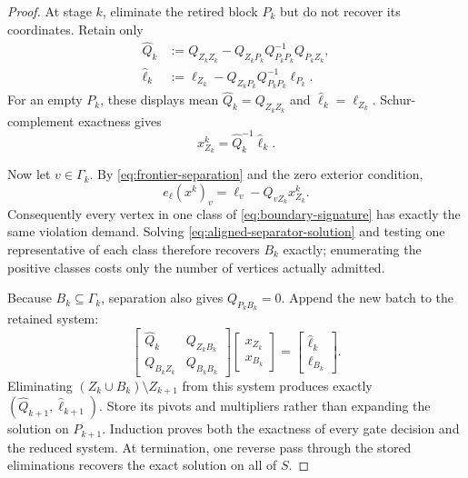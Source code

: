 \begin{proof}
At stage $k$, eliminate the retired block $P_k$ but do not recover its
coordinates.  Retain only
\begin{align}
 \widehat Q_k
 &:={Q}_{Z_kZ_k}
   -Q_{Z_kP_k}Q_{P_kP_k}^{-1}Q_{P_kZ_k},
 \label{eq:aligned-reduced-matrix}\\
 \widehat\ell_k
 &:=\ell_{Z_k}
   -Q_{Z_kP_k}Q_{P_kP_k}^{-1}\ell_{P_k}.
 \label{eq:aligned-reduced-load}
\end{align}
For an empty $P_k$, these displays mean
$\widehat Q_k=Q_{Z_kZ_k}$ and
$\widehat\ell_k=\ell_{Z_k}$.  Schur-complement exactness gives
\begin{equation}
 x^k_{Z_k}=\widehat Q_k^{-1}\widehat\ell_k.
 \label{eq:aligned-separator-solution}
\end{equation}

Now let $v\in\Gamma_k$.  By
\cref{eq:frontier-separation} and the zero exterior condition,
\begin{equation}
 e_\ell(x^k)_v
 =\ell_v-Q_{vZ_k}x^k_{Z_k}.
 \label{eq:signature-demand}
\end{equation}
Consequently every vertex in one class of
\cref{eq:boundary-signature} has exactly the same violation demand.  Solving
\cref{eq:aligned-separator-solution} and testing one representative of each
class therefore recovers $B_k$ exactly; enumerating the positive classes
costs only the number of vertices actually admitted.

Because $B_k\subseteq\Gamma_k$, separation also gives
$Q_{P_kB_k}=0$.  Append the new batch to the retained system:
\begin{equation}
 \begin{bmatrix}
  \widehat Q_k&Q_{Z_kB_k}\\
  Q_{B_kZ_k}&Q_{B_kB_k}
 \end{bmatrix}
 \begin{bmatrix}x_{Z_k}\\x_{B_k}\end{bmatrix}
 =
 \begin{bmatrix}\widehat\ell_k\\\ell_{B_k}\end{bmatrix}.
 \label{eq:aligned-frontal-system}
\end{equation}
Eliminating
$(Z_k\cup B_k)\setminus Z_{k+1}$ from this system produces exactly
$(\widehat Q_{k+1},\widehat\ell_{k+1})$.  Store its pivots and multipliers
rather than expanding the solution on $P_{k+1}$.  Induction proves both the
exactness of every gate decision and the reduced system.  At termination,
one reverse pass through the stored eliminations recovers the exact solution
on all of $S$.


\end{proof}
